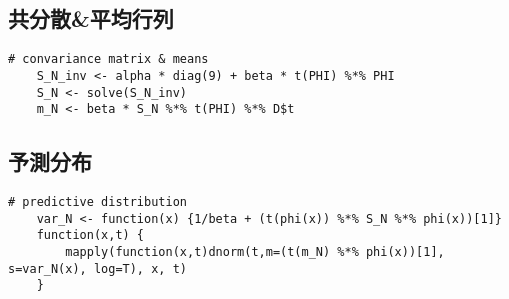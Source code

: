 \documentclass[uplatex]{jsarticle}
\begin{document}
\subsection{共分散\&平均行列}
\begin{lstlisting}[basicstyle=\ttfamily\footnotesize, frame=single]
    # convariance matrix & means
    S_N_inv <- alpha * diag(9) + beta * t(PHI) %*% PHI
    S_N <- solve(S_N_inv)
    m_N <- beta * S_N %*% t(PHI) %*% D$t
\end{lstlisting}

\subsection{予測分布}
\begin{lstlisting}[basicstyle=\ttfamily\footnotesize, frame=single]
    # predictive distribution
    var_N <- function(x) {1/beta + (t(phi(x)) %*% S_N %*% phi(x))[1]}
    function(x,t) {
        mapply(function(x,t)dnorm(t,m=(t(m_N) %*% phi(x))[1], s=var_N(x), log=T), x, t)
    }
\end{lstlisting}
\end{document}
